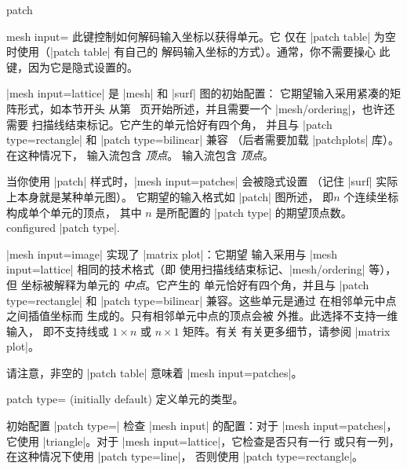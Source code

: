 {\begin{plottype}[/pgfplots]{patch}
    \begin{pgfplotskey}{mesh input=}
        此键控制如何解码输入坐标以获得单元。它
        仅在 |patch table| 为空时使用（|patch table| 有自己的
        解码输入坐标的方式）。通常，你不需要操心
        此键，因为它是隐式设置的。

        |mesh input=lattice| 是 |mesh| 和 |surf| 图的初始配置：
        它期望输入采用紧凑的矩阵形式，如本节开头
        从第~\pageref{sec:3d} 页开始所述，并且需要一个 |mesh/ordering|，也许还需要
        扫描线结束标记。它产生的单元恰好有四个角，
        并且与 |patch type=rectangle| 和 |patch type=bilinear| 兼容
        （后者需要加载 |patchplots| 库）。在这种情况下，
        输入流包含 \emph{顶点}。
        输入流包含 \emph{顶点}。

        当你使用 |patch| 样式时，|mesh input=patches| 会被隐式设置
        （记住 |surf| 实际上本身就是某种单元图）。
        它期望的输入格式如 |patch| 图所述，
        即\@ $n$ 个连续坐标构成单个单元的顶点，
        其中 $n$ 是所配置的 |patch type| 的期望顶点数。
        configured |patch type|.

        |mesh input=image| 实现了 |matrix plot|：它期望
        输入采用与 |mesh input=lattice| 相同的技术格式（即\@
        使用扫描线结束标记、|mesh/ordering| 等），但
        坐标被解释为单元的 \emph{中点}。它产生的
        单元恰好有四个角，并且与
        |patch type=rectangle| 和 |patch type=bilinear| 兼容。这些单元是通过
        在相邻单元中点之间插值坐标而
        生成的。只有相邻单元中点的顶点会被
        外推。此选择不支持一维输入，
        即\@ 不支持线或 $1\times n$ 或 $n \times 1$ 矩阵。有关
        有关更多细节，请参阅 |matrix plot|。

        请注意，非空的 |patch table| 意味着 |mesh input=patches|。
    \end{pgfplotskey}

    \begin{pgfplotskey}{patch type= (initially default)}
    \label{key:patch:type}
        定义单元的类型。

        初始配置 |patch type=| 检查
        |mesh input| 的配置：对于 |mesh input=patches|，它使用
        |triangle|。对于 |mesh input=lattice|，它检查是否只有一行
        或只有一列，在这种情况下使用 |patch type=line|，
        否则使用 |patch type=rectangle|。


\end{pgfplotskey}
\end{plottype}}
